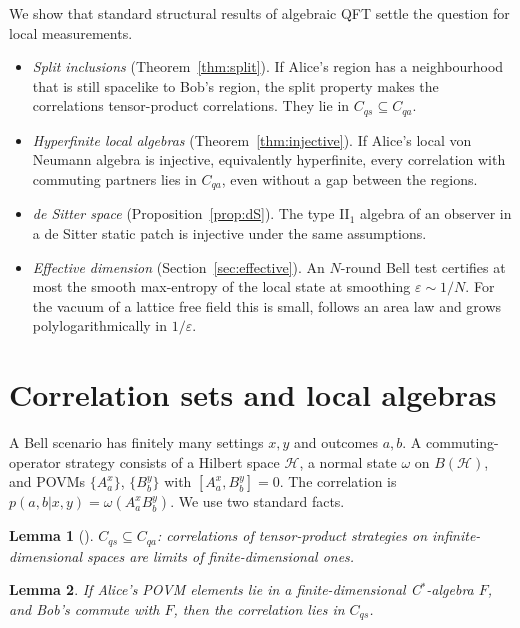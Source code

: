 \documentclass[11pt]{article}
\newtheorem{lemma}{Lemma}[section]
\theoremstyle{definition}\newtheorem{definition}{Definition}[section]
\theoremstyle{remark}\newtheorem*{remark}{Remark}
\newcommand{\Hil}{\mathcal H}
\newcommand{\Cqa}{C_{qa}}
\newcommand{\Cqs}{C_{qs}}
\begin{document}
We show that standard structural results of algebraic QFT settle the question for local measurements.
\begin{itemize}
\item \emph{Split inclusions} (Theorem~\ref{thm:split}). If Alice's region has a neighbourhood that is still spacelike
to Bob's region, the split property makes the correlations tensor-product correlations. They lie in $\Cqs\subseteq\Cqa$.
\item \emph{Hyperfinite local algebras} (Theorem~\ref{thm:injective}). If Alice's local von Neumann algebra is injective,
equivalently hyperfinite, every correlation with commuting partners lies in $\Cqa$, even without a gap between the
regions.
\item \emph{de Sitter space} (Proposition~\ref{prop:dS}). The type II$_1$ algebra of an observer in a de Sitter static
patch is injective under the same assumptions.
\item \emph{Effective dimension} (Section~\ref{sec:effective}). An $N$-round Bell test certifies at most the smooth max-entropy
of the local state at smoothing $\varepsilon\sim1/N$. For the vacuum of a lattice free field this is small, follows an area law
and grows polylogarithmically in $1/\varepsilon$.
\end{itemize}

\section{Correlation sets and local algebras}
\label{sec:setting}

A Bell scenario has finitely many settings $x,y$ and outcomes $a,b$. A commuting-operator strategy consists of a
Hilbert space $\Hil$, a normal state $\omega$ on $B(\Hil)$, and POVMs $\{A^x_a\}$, $\{B^y_b\}$ with $[A^x_a,B^y_b]=0$. The
correlation is $p(a,b|x,y)=\omega(A^x_aB^y_b)$. We use two standard facts.

\begin{lemma}[\cite{ScholzWerner,Fritz}]
\label{lem:qs}
$\Cqs\subseteq\Cqa$: correlations of tensor-product strategies on infinite-dimensional spaces are limits of
finite-dimensional ones.
\end{lemma}

\begin{lemma}
\label{lem:finiteA}
If Alice's POVM elements lie in a finite-dimensional C$^*$-algebra $F$, and Bob's commute with $F$, then the correlation lies
in $\Cqs$.
\end{lemma}
\end{document}
